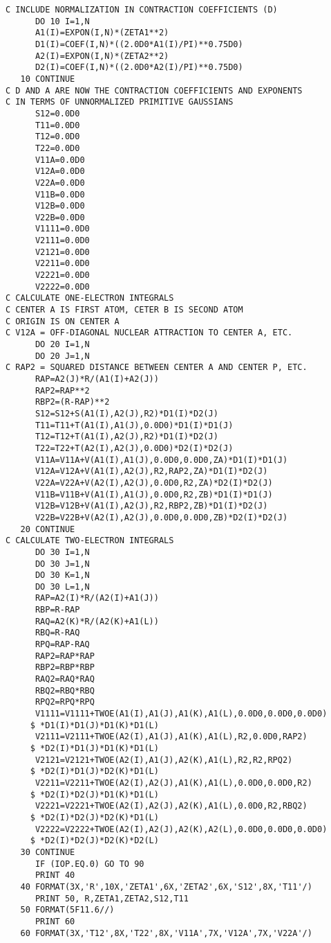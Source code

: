 \begin{verbatim}
C INCLUDE NORMALIZATION IN CONTRACTION COEFFICIENTS (D)
      DO 10 I=1,N
      A1(I)=EXPON(I,N)*(ZETA1**2)
      D1(I)=COEF(I,N)*((2.0D0*A1(I)/PI)**0.75D0)
      A2(I)=EXPON(I,N)*(ZETA2**2)
      D2(I)=COEF(I,N)*((2.0D0*A2(I)/PI)**0.75D0)
   10 CONTINUE
C D AND A ARE NOW THE CONTRACTION COEFFICIENTS AND EXPONENTS
C IN TERMS OF UNNORMALIZED PRIMITIVE GAUSSIANS
      S12=0.0D0
      T11=0.0D0
      T12=0.0D0
      T22=0.0D0
      V11A=0.0D0
      V12A=0.0D0
      V22A=0.0D0
      V11B=0.0D0
      V12B=0.0D0
      V22B=0.0D0
      V1111=0.0D0
      V2111=0.0D0
      V2121=0.0D0
      V2211=0.0D0
      V2221=0.0D0
      V2222=0.0D0
C CALCULATE ONE-ELECTRON INTEGRALS
C CENTER A IS FIRST ATOM, CETER B IS SECOND ATOM
C ORIGIN IS ON CENTER A
C V12A = OFF-DIAGONAL NUCLEAR ATTRACTION TO CENTER A, ETC.
      DO 20 I=1,N
      DO 20 J=1,N
C RAP2 = SQUARED DISTANCE BETWEEN CENTER A AND CENTER P, ETC.
      RAP=A2(J)*R/(A1(I)+A2(J))
      RAP2=RAP**2
      RBP2=(R-RAP)**2
      S12=S12+S(A1(I),A2(J),R2)*D1(I)*D2(J)
      T11=T11+T(A1(I),A1(J),0.0D0)*D1(I)*D1(J)
      T12=T12+T(A1(I),A2(J),R2)*D1(I)*D2(J)
      T22=T22+T(A2(I),A2(J),0.0D0)*D2(I)*D2(J)
      V11A=V11A+V(A1(I),A1(J),0.0D0,0.0D0,ZA)*D1(I)*D1(J)
      V12A=V12A+V(A1(I),A2(J),R2,RAP2,ZA)*D1(I)*D2(J)
      V22A=V22A+V(A2(I),A2(J),0.0D0,R2,ZA)*D2(I)*D2(J)
      V11B=V11B+V(A1(I),A1(J),0.0D0,R2,ZB)*D1(I)*D1(J)
      V12B=V12B+V(A1(I),A2(J),R2,RBP2,ZB)*D1(I)*D2(J)
      V22B=V22B+V(A2(I),A2(J),0.0D0,0.0D0,ZB)*D2(I)*D2(J)
   20 CONTINUE
C CALCULATE TWO-ELECTRON INTEGRALS
      DO 30 I=1,N
      DO 30 J=1,N
      DO 30 K=1,N
      DO 30 L=1,N
      RAP=A2(I)*R/(A2(I)+A1(J))
      RBP=R-RAP
      RAQ=A2(K)*R/(A2(K)+A1(L))
      RBQ=R-RAQ
      RPQ=RAP-RAQ
      RAP2=RAP*RAP
      RBP2=RBP*RBP
      RAQ2=RAQ*RAQ
      RBQ2=RBQ*RBQ
      RPQ2=RPQ*RPQ
      V1111=V1111+TWOE(A1(I),A1(J),A1(K),A1(L),0.0D0,0.0D0,0.0D0)
     $ *D1(I)*D1(J)*D1(K)*D1(L)
      V2111=V2111+TWOE(A2(I),A1(J),A1(K),A1(L),R2,0.0D0,RAP2)
     $ *D2(I)*D1(J)*D1(K)*D1(L)
      V2121=V2121+TWOE(A2(I),A1(J),A2(K),A1(L),R2,R2,RPQ2)
     $ *D2(I)*D1(J)*D2(K)*D1(L)
      V2211=V2211+TWOE(A2(I),A2(J),A1(K),A1(L),0.0D0,0.0D0,R2)
     $ *D2(I)*D2(J)*D1(K)*D1(L)
      V2221=V2221+TWOE(A2(I),A2(J),A2(K),A1(L),0.0D0,R2,RBQ2)
     $ *D2(I)*D2(J)*D2(K)*D1(L)
      V2222=V2222+TWOE(A2(I),A2(J),A2(K),A2(L),0.0D0,0.0D0,0.0D0)
     $ *D2(I)*D2(J)*D2(K)*D2(L)
   30 CONTINUE
      IF (IOP.EQ.0) GO TO 90
      PRINT 40
   40 FORMAT(3X,'R',10X,'ZETA1',6X,'ZETA2',6X,'S12',8X,'T11'/)
      PRINT 50, R,ZETA1,ZETA2,S12,T11
   50 FORMAT(5F11.6//)
      PRINT 60
   60 FORMAT(3X,'T12',8X,'T22',8X,'V11A',7X,'V12A',7X,'V22A'/)

\end{verbatim}
